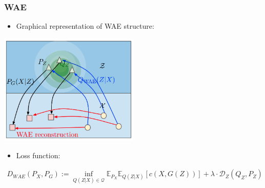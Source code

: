 \documentclass{beamer}
\begin{document}
\begin{frame}
\frametitle{WAE}
\begin{itemize}
  \item Graphical representation of WAE structure:
\end{itemize}
\begin{center}
  \includegraphics[width=0.50\textwidth,keepaspectratio]{./figures/wae_structure}
\end{center}
\begin{itemize}
  \item Loss function:
\end{itemize}
\begin{align*}
  D_{WAE}(P_X, P_G) := \inf_{Q(Z|X)\in\mathcal{Q}} \mathbb{E}_{P_X}\mathbb{E}_{Q(Z|X)}\left[c(X, G(Z))\right] + \lambda \cdot \mathcal{D}_Z(Q_Z, P_Z)
\end{align*}
\end{frame}
\end{document}
